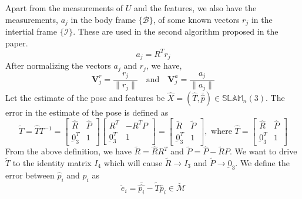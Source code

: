 \documentclass[12pt]{article}
\def\omani#1{\breve{#1}}
\begin{document}
Apart from the measurements of $U$ and the features, we also have the measurements, $a_j$ in the body 
frame $\{\mathcal{B}\}$, of some known vectors $r_j$ in the intertial frame $\{\mathcal{I}\}$. These are used 
in the second algorithm proposed in the paper.
\begin{equation}
    a_j = R^T r_j
\end{equation}
After normalizing the vectors $a_j$ and $r_j$, we have,
\begin{equation}
        \mathbf{V}_j^r = \frac{r_j}{\| r_j\|} \quad \text{and} \quad \mathbf{V}_j^a = \frac{a_j}{\| a_j\|}
\end{equation}
Let the estimate of the pose and features be $\hat{X} = (\hat{T}, \bar{\hat{p}}) \in \mathbb{SLAM}_n(3)$.
The error in the estimate of the pose is defined as 
\begin{equation}
    \tilde T = \hat{T} T^{-1} = 
    \begin{bmatrix}
        \hat R & \hat P \\
        \underbar{0}_3^T & 1
    \end{bmatrix}
    \begin{bmatrix}
        R^T & -R^T P \\
        \underbar{0}_3^T & 1
    \end{bmatrix}
    =
    \begin{bmatrix}
        \tilde R & \tilde P \\
        \underbar{0}_3^T & 1
    \end{bmatrix},
     \text{ where }
     \hat{T} =
        \begin{bmatrix}
            \hat R & \hat P \\
            \underbar{0}_3^T & 1
        \end{bmatrix}
\end{equation}
From the above definition, we have $\tilde R = \hat R R^T$ and $\tilde P = \hat P - \tilde R P$.
We want to drive $\tilde{T}$ to the identity matrix $I_4$ which will cause $\tilde{R} \rightarrow I_3$ and $\tilde{P}\rightarrow \underbar{0}_3$.
We define the error between $\hat p_i$ and $p_i$ as 
\begin{equation} \label{eq:error}
    \omani e_i = \bar{\hat{p_i}} - \tilde{T}\bar p_i \in \omani{\mathcal{M}}
\end{equation}
\end{document}
